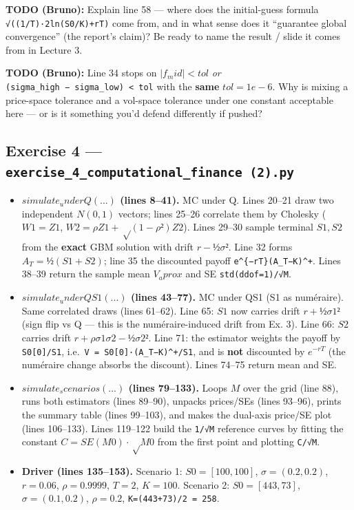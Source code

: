 \documentclass[
  11pt,
]{article}
\providecommand{\tightlist}{%
  \setlength{\itemsep}{0pt}\setlength{\parskip}{0pt}}
\begin{document}
\textbf{TODO (Bruno):} Explain line 58 --- where does the initial-guess
formula \texttt{√((1/T)·2\textbar{}ln(S0/K)+rT\textbar{})} come from,
and in what sense does it ``guarantee global convergence'' (the report's
claim)? Be ready to name the result / slide it comes from in Lecture 3.

\textbf{TODO (Bruno):} Line 34 stops on \(|f_mid| < tol\) \emph{or}
\texttt{(sigma\_high\ −\ sigma\_low)\ \textless{}\ tol} with the
\textbf{same} \(tol = 1e-6\). Why is mixing a price-space tolerance and
a vol-space tolerance under one constant acceptable here --- or is it
something you'd defend differently if pushed?

\hypertarget{exercise-4-exercise_4_computational_finance-2.py}{%
\subsection{\texorpdfstring{Exercise 4 ---
\texttt{exercise\_4\_computational\_finance\ (2).py}}{Exercise 4 --- exercise\_4\_computational\_finance (2).py}}\label{exercise-4-exercise_4_computational_finance-2.py}}

\begin{itemize}
\tightlist
\item
  \textbf{\(simulate_underQ(...)\) (lines 8--41).} MC under Q. Lines
  20--21 draw two independent \(N(0,1)\) vectors; lines 25--26 correlate
  them by Cholesky (\(W1 = Z1\), \(W2 = ρZ1 + √(1−ρ²)Z2\)). Lines 29--30
  sample terminal \(S1,S2\) from the \textbf{exact} GBM solution with
  drift \(r − ½σ²\). Line 32 forms \(A_T = ½(S1+S2)\); line 35 the
  discounted payoff \texttt{e\^{}\{−rT\}(A\_T−K)\^{}+}. Lines 38--39
  return the sample mean \(V_aprox\) and SE \texttt{std(ddof=1)/√M}.
\item
  \textbf{\(simulate_underQS1(...)\) (lines 43--77).} MC under QS1 (S1
  as numéraire). Same correlated draws (lines 61--62). Line 65: \(S1\)
  now carries drift \(r + ½σ1²\) (sign flip vs Q --- this is the
  numéraire-induced drift from Ex. 3). Line 66: \(S2\) carries drift
  \(r + ρσ1σ2 − ½σ2²\). Line 71: the estimator weights the payoff by
  \texttt{S0{[}0{]}/S1}, i.e.~\texttt{V\ =\ S0{[}0{]}·(A\_T−K)\^{}+/S1},
  and is \textbf{not} discounted by \(e^{−rT}\) (the numéraire change
  absorbs the discount). Lines 74--75 return mean and SE.
\item
  \textbf{\(simulate_scenarios(...)\) (lines 79--133).} Loops \(M\) over
  the grid (line 88), runs both estimators (lines 89--90), unpacks
  prices/SEs (lines 93--96), prints the summary table (lines 99--103),
  and makes the dual-axis price/SE plot (lines 106--133). Lines 119--122
  build the \texttt{1/√M} reference curves by fitting the constant
  \(C = SE(M0)·√M0\) from the first point and plotting \texttt{C/√M}.
\item
  \textbf{Driver (lines 135--153).} Scenario 1: \(S0=[100,100]\),
  \(σ=(0.2,0.2)\), \(r=0.06\), \(ρ=0.9999\), \(T=2\), \(K=100\).
  Scenario 2: \(S0=[443,73]\), \(σ=(0.1,0.2)\), \(ρ=0.2\),
  \texttt{K=(443+73)/2\ =\ 258}.
\end{itemize}
\end{document}
